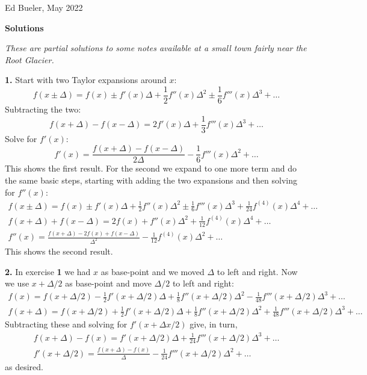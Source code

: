 \documentclass[10pt]{amsart}
\newcommand{\normalspacing}{\renewcommand{\baselinestretch}{1.05}
        \tiny\normalsize}
\newcommand{\prob}[1]{\bigskip\noindent\large\textbf{#1.}\normalsize }
\begin{document}
\scriptsize
\hfill Ed Bueler, May 2022

\vspace{10mm}

\Large\centerline{\textbf{Solutions}}

\medskip
\small
\centerline{\emph{These are partial solutions to some notes available at a small town fairly near the Root Glacier.}}
\normalsize

\bigskip\bigskip

\thispagestyle{empty}
\normalspacing

\prob{1}  Start with two Taylor expansions around $x$:
    $$f(x\pm \Delta) = f(x) \pm f'(x) \Delta + \frac{1}{2} f''(x) \Delta^2 \pm \frac{1}{6} f'''(x) \Delta^3 + \dots$$
Subtracting the two:
    $$f(x+\Delta) - f(x-\Delta) = 2 f'(x) \Delta + \frac{1}{3} f'''(x) \Delta^3 + \dots$$
Solve for $f'(x)$:
    $$f'(x) = \frac{f(x+\Delta) - f(x-\Delta)}{2\Delta} - \frac{1}{6} f'''(x) \Delta^2 + \dots$$
This shows the first result.  For the second we expand to one more term and do the same basic steps, starting with adding the two expansions and then solving for $f''(x)$:
\begin{gather*}
    f(x\pm \Delta) = f(x) \pm f'(x) \Delta + \frac{1}{2} f''(x) \Delta^2 \pm \frac{1}{6} f'''(x) \Delta^3 + \frac{1}{24} f^{(4)}(x) \Delta^4 + \dots \\
    f(x + \Delta) + f(x - \Delta) = 2 f(x) + f''(x) \Delta^2 + \frac{1}{12} f^{(4)}(x) \Delta^4 + \dots \\
    f''(x) = \frac{f(x + \Delta) - 2 f(x) + f(x - \Delta)}{\Delta^2} - \frac{1}{12} f^{(4)}(x) \Delta^2 + \dots
\end{gather*}
This shows the second result.

\prob{2}  In exercise \textbf{1} we had $x$ as base-point and we moved $\Delta$ to left and right.  Now we use $x+\Delta/2$ as base-point and move $\Delta/2$ to left and right:
\begin{gather*}
f(x) = f(x+\Delta/2) - \frac{1}{2} f'(x+\Delta/2) \Delta + \frac{1}{8} f''(x+\Delta/2) \Delta^2 - \frac{1}{48} f'''(x+\Delta/2) \Delta^3 + \dots \\
f(x+\Delta) = f(x+\Delta/2) + \frac{1}{2} f'(x+\Delta/2) \Delta + \frac{1}{8} f''(x+\Delta/2) \Delta^2 + \frac{1}{48} f'''(x+\Delta/2) \Delta^3 + \dots
\end{gather*}
Subtracting these and solving for $f'(x+\Delta x/2)$ give, in turn,
\begin{gather*}
f(x+\Delta) - f(x) = f'(x+\Delta/2) \Delta + \frac{1}{24} f'''(x+\Delta/2) \Delta^3 + \dots \\
f'(x+\Delta/2) = \frac{f(x+\Delta) - f(x)}{\Delta} - \frac{1}{24} f'''(x+\Delta/2) \Delta^2 + \dots
\end{gather*}
as desired.
\end{document}
